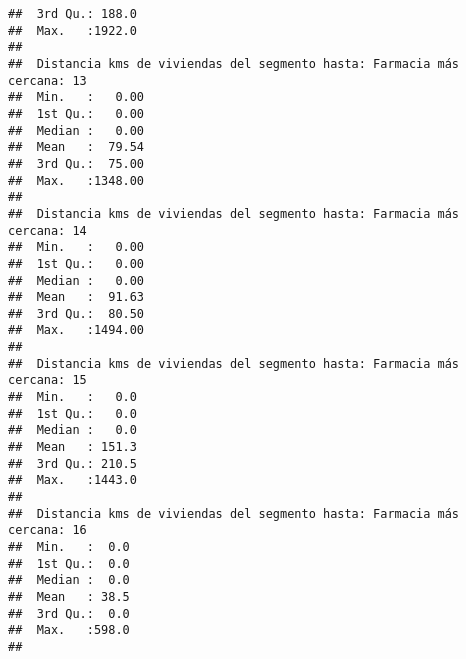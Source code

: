 \documentclass[11pt,]{article}
\begin{document}
\begin{verbatim}
##  3rd Qu.: 188.0                                                         
##  Max.   :1922.0                                                         
##                                                                         
##  Distancia kms de viviendas del segmento hasta: Farmacia más cercana: 13
##  Min.   :   0.00                                                        
##  1st Qu.:   0.00                                                        
##  Median :   0.00                                                        
##  Mean   :  79.54                                                        
##  3rd Qu.:  75.00                                                        
##  Max.   :1348.00                                                        
##                                                                         
##  Distancia kms de viviendas del segmento hasta: Farmacia más cercana: 14
##  Min.   :   0.00                                                        
##  1st Qu.:   0.00                                                        
##  Median :   0.00                                                        
##  Mean   :  91.63                                                        
##  3rd Qu.:  80.50                                                        
##  Max.   :1494.00                                                        
##                                                                         
##  Distancia kms de viviendas del segmento hasta: Farmacia más cercana: 15
##  Min.   :   0.0                                                         
##  1st Qu.:   0.0                                                         
##  Median :   0.0                                                         
##  Mean   : 151.3                                                         
##  3rd Qu.: 210.5                                                         
##  Max.   :1443.0                                                         
##                                                                         
##  Distancia kms de viviendas del segmento hasta: Farmacia más cercana: 16
##  Min.   :  0.0                                                          
##  1st Qu.:  0.0                                                          
##  Median :  0.0                                                          
##  Mean   : 38.5                                                          
##  3rd Qu.:  0.0                                                          
##  Max.   :598.0                                                          
##                                                                         

\end{verbatim}
\end{document}
